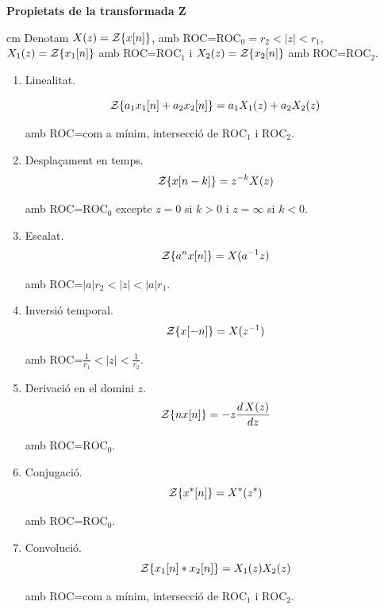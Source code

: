 \documentclass{article}
\begin{document}
\newpage
\noindent
\textbf{Propietats de la transformada Z}

 cm
\noindent
Denotam $X(z)={\cal Z} \{ x[n] \}$, amb ROC=$\text{ROC}_0 = r_2 < |z| < r_1$,
$X_1(z)={\cal Z} \{ x_1[n] \}$ amb ROC=$\text{ROC}_1$ i
$X_2(z)={\cal Z} \{ x_2[n] \}$ amb ROC=$\text{ROC}_2$.

\begin{enumerate}
\item Linealitat. 

\[
{\cal Z} \{ a_1 x_1[n] + a_2 x_2[n] \} = a_1 X_1(z) + a_2 X_2(z) 
\]

amb ROC=com a m\'inim, intersecci\'o de $\text{ROC}_1$ i $\text{ROC}_2$.

\item Despla\c{c}ament en temps.
\[
{\cal Z} \{ x[n-k] \} = z^{-k} X(z)
\]

amb ROC=$\text{ROC}_0$ excepte $z=0$ si $k > 0$ i $z=\infty$ si $k < 0$. 

\item Escalat.
\[
{\cal Z} \{ a^n x[n] \} = X(a^{-1} z) 
\]

amb ROC=$|a| r_2 < |z| < |a| r_1$.

\item Inversi\'o temporal.
\[
{\cal Z} \{ x[-n] \} = X(z^{-1}) 
\]

amb ROC=$\frac{1}{r_1} < |z| < \frac{1}{r_2}$.


\item Derivaci\'o en el domini $z$.
\[
{\cal Z} \{ nx[n] \} = -z \frac{d \, X(z) }{dz} 
\]

amb ROC=$\text{ROC}_0$.


\item Conjugaci\'o.
\[
{\cal Z} \{ x^*[n] \} = X^*(z^*) 
\]

amb ROC=$\text{ROC}_0$.

\item Convoluci\'o.
\[
{\cal Z} \{ x_1[n] * x_2[n] \} = X_1(z) X_2(z)
\]

amb ROC=com a m\'inim, intersecci\'o de $\text{ROC}_1$ i $\text{ROC}_2$.


\end{enumerate}

\end{document}
